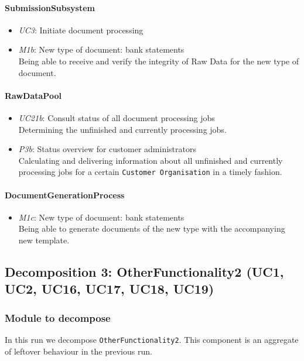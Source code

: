 \documentclass[a4paper,10pt]{article}
\begin{document}
\paragraph{SubmissionSubsystem}
\begin{itemize}
	\item \emph{UC3}: Initiate document processing
	\item \emph{M1b}: New type of document: bank statements\\
	Being able to receive and verify the integrity of Raw Data for the new type of document.
\end{itemize}

\paragraph{RawDataPool}
\begin{itemize}
	\item \emph{UC21b}: Consult status of all document processing jobs\\
	Determining the unfinished and currently processing jobs.
	\item \emph{P3b}: Status overview for customer administrators\\
	Calculating and delivering information about all unfinished and currently processing jobs for a certain \texttt{Customer Organisation} in a timely fashion.
\end{itemize}

\paragraph{DocumentGenerationProcess}
\begin{itemize}
	\item \emph{M1c}: New type of document: bank statements\\
	Being able to generate documents of the new type with the accompanying new template.
\end{itemize}

\subsection{Decomposition 3: OtherFunctionality2 (UC1, UC2, UC16, UC17, UC18, UC19)}
\subsubsection{Module to decompose}
In this run we decompose \texttt{OtherFunctionality2}. This component is an aggregate of leftover behaviour in the previous run.
\end{document}
